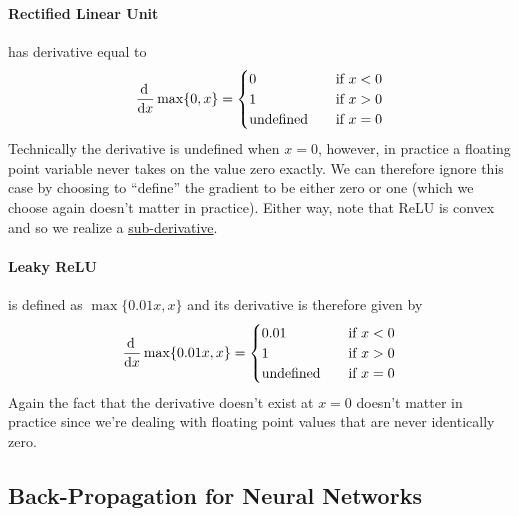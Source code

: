 \documentclass[12pt]{article}
\begin{document}
\paragraph{Rectified Linear Unit} has derivative equal to
\begin{align}   \frac{\operatorname{d}\!{\,}}{\operatorname{d}\!{x}} \max\{0,x\}=       \begin{cases}        0 &\quad\text{if } x < 0\\        1 &\quad\text{if } x > 0 \\
       \textrm{undefined} &\quad\text{if } x = 0      \end{cases} \end{align}
Technically the derivative is undefined when $x = 0$, however, in practice a floating point variable never takes on the value zero exactly. We can therefore ignore this case by choosing to ``define'' the gradient to be either zero or one (which we choose again doesn't matter in practice). Either way, note that ReLU is convex and so we realize a \href{https://en.wikipedia.org/wiki/Subderivative}{sub-derivative}.

\paragraph{Leaky ReLU} is defined as $\max \{0.01 x, x \}$ and its derivative is therefore given by
\begin{align}   
  \frac{\operatorname{d}\!{\,}}{\operatorname{d}\!{x}} \max\{0.01x,x\}=       
  \begin{cases}        
    0.01 &\quad\text{if } x < 0\\        
    1    &\quad\text{if } x > 0 \\
    \textrm{undefined} &\quad\text{if } x = 0      
  \end{cases} 
\end{align}
Again the fact that the derivative doesn't exist at $x=0$ doesn't matter in practice since we're dealing with floating point values that are never identically zero.

\subsection{Back-Propagation for Neural Networks}
\end{document}
